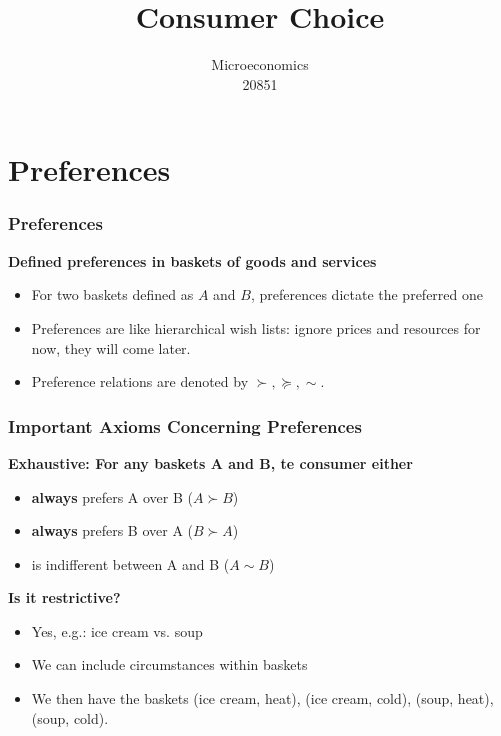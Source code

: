 \documentclass[handout]{beamer}
\title{Consumer Choice}
\author{Microeconomics \\ 20851}
\date{}
\begin{document}
\frame{\titlepage}

\section[Outline]{}
\frame{\tableofcontents}

\section{Preferences}

\begin{frame}\frametitle{Preferences}
\textbf{Defined preferences in baskets of goods and services}
\begin{itemize} \item For two baskets defined as $A$ and $B$, preferences dictate the preferred one
\item Preferences are like hierarchical wish lists: ignore prices and resources for now, they will come later. 
\item Preference relations are denoted by $\succ,\succeq,\sim$. 
\end{itemize}

\end{frame}

\begin{frame}\frametitle{Important Axioms Concerning Preferences}

\textbf{Exhaustive: For any baskets A and B, te consumer either}
\begin{itemize}
\item  \textbf{always} prefers A over B ($A\succ B$)
\item  \textbf{always} prefers B over A ($B\succ A$)
\item is indifferent between A and B ($A \sim B$) \end{itemize}

\textbf{Is it restrictive?}
\begin{itemize}
\item Yes, e.g.: ice cream vs. soup
\item We can include circumstances within baskets
\item We then have the baskets (ice cream, heat), (ice cream, cold), (soup, heat), (soup, cold).
\end{itemize}
\end{frame}
\end{document}
